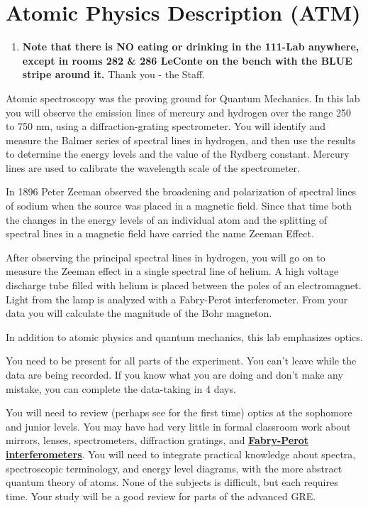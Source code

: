 \documentclass{../lab}
\begin{document}
\maketitle

\tableofcontents

\section{Atomic Physics Description (ATM)}

\begin{enumerate}
    \item \textbf{Note that there is NO eating or drinking in the 111-Lab anywhere, except in rooms 282 \& 286 LeConte on the bench with the BLUE stripe around it.} Thank you - the Staff.

\end{enumerate}

Atomic spectroscopy was the proving ground for Quantum Mechanics. In this lab you will observe the emission lines of mercury and hydrogen over the range 250 to 750 nm, using a diffraction-grating spectrometer. You will identify and measure the Balmer series of spectral lines in hydrogen, and then use the results to determine the energy levels and the value of the Rydberg constant. Mercury lines are used to calibrate the wavelength scale of the spectrometer.

In 1896 Peter Zeeman observed the broadening and polarization of spectral lines of sodium when the source was placed in a magnetic field. Since that time both the changes in the energy levels of an individual atom and the splitting of spectral lines in a magnetic field have carried the name Zeeman Effect.

After observing the principal spectral lines in hydrogen, you will go on to measure the Zeeman effect in a single spectral line of helium. A high voltage discharge tube filled with helium is placed between the poles of an electromagnet. Light from the lamp is analyzed with a Fabry-Perot interferometer. From your data you will calculate the magnitude of the Bohr magneton.

In addition to atomic physics and quantum mechanics, this lab emphasizes optics.

You need to be present for all parts of the experiment. You can't leave while the data are being recorded. If you know what you are doing and don't make any mistake, you can complete the data-taking in 4 days.

You will need to review (perhaps see for the first time) optics at the sophomore and junior levels. You may have had very little in formal classroom work about mirrors, lenses, spectrometers, diffraction gratings, and \href{http://experimentationlab.berkeley.edu/sites/default/files/ATM/Etalons\_TechNote-3pages.pdf}{\textbf{Fabry-Perot interferometers}}. You will need to integrate practical knowledge about spectra, spectroscopic terminology, and energy level diagrams, with the more abstract quantum theory of atoms. None of the subjects is difficult, but each requires time. Your study will be a good review for parts of the advanced GRE.
\end{document}
